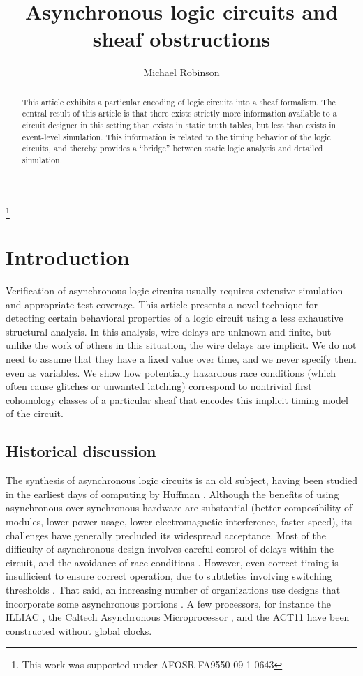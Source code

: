 \documentclass{amsart}
\title{Asynchronous logic circuits and sheaf obstructions}
\author{Michael Robinson}
\theoremstyle{plain}
\theoremstyle{definition}
\begin{document}
\thanks{This work was supported under AFOSR FA9550-09-1-0643}

\begin{abstract}
This article exhibits a particular encoding of logic circuits into a
sheaf formalism.  The central result of this article is that there
exists strictly more information available to a circuit designer in
this setting than exists in static truth tables, but less than exists
in event-level simulation.  This information is related to the timing
behavior of the logic circuits, and thereby provides a ``bridge''
between static logic analysis and detailed simulation.
\end{abstract}

\maketitle

\section{Introduction}

Verification of asynchronous logic circuits usually requires extensive
simulation and appropriate test coverage.  This article presents a
novel technique for detecting certain behavioral properties of a logic
circuit using a less exhaustive structural analysis.  In this
analysis, wire delays are unknown and finite, but unlike the work of
others in this situation, the wire delays are implicit.  We do not
need to assume that they have a fixed value over time, and we never
specify them even as variables.  We show how potentially hazardous
race conditions (which often cause glitches or unwanted latching)
correspond to nontrivial first cohomology classes of a particular
sheaf that encodes this implicit timing model of the circuit.

\subsection{Historical discussion}

The synthesis of asynchronous logic circuits is an old subject, having
been studied in the earliest days of computing by Huffman
\cite{Huffman_1954}.  Although the benefits of using asynchronous over
synchronous hardware are substantial (better composibility of modules,
lower power usage, lower electromagnetic interference, faster speed),
its challenges have generally precluded its widespread acceptance.
Most of the difficulty of asynchronous design involves careful control
of delays within the circuit, and the avoidance of race conditions
\cite{Manohar_1995}.  However, even correct timing is insufficient to
ensure correct operation, due to subtleties involving switching
thresholds \cite{Berkel_1992}.  That said, an increasing number of
organizations use designs that incorporate some asynchronous portions
\cite{Edwards_2004}.  A few processors, for instance the ILLIAC
\cite{Robertson}, the Caltech Asynchronous Microprocessor
\cite{Martin_1989}, and the ACT11 \cite{Epson_2005}
have been constructed without global clocks.
\end{document}
